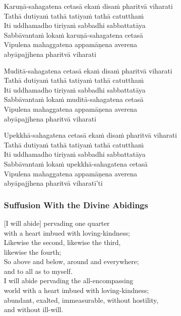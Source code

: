 Karuṇā-sahagatena cetasā ekaṁ disaṁ pharitvā viharati\\
Tathā dutiyaṁ tathā tatiyaṁ tathā catutthaṁ\\
Iti uddhamadho tiriyaṁ sabbadhi sabbattatāya\\
Sabbāvantaṁ lokaṁ karuṇā-sahagatena cetasā\\
Vipulena mahaggatena appamāṇena averena\\
abyāpajjhena pharitvā viharati

Muditā-sahagatena cetasā ekaṁ disaṁ pharitvā viharati\\
Tathā dutiyaṁ tathā tatiyaṁ tathā catutthaṁ\\
Iti uddhamadho tiriyaṁ sabbadhi sabbattatāya\\
Sabbāvantaṁ lokaṁ muditā-sahagatena cetasā\\
Vipulena mahaggatena appamāṇena averena\\
abyāpajjhena pharitvā viharati

\clearpage

Upekkhā-sahagatena cetasā ekaṁ disaṁ pharitvā viharati\\
Tathā dutiyaṁ tathā tatiyaṁ tathā catutthaṁ\\
Iti uddhamadho tiriyaṁ sabbadhi sabbattatāya\\
Sabbāvantaṁ lokaṁ upekkhā-sahagatena cetasā\\
Vipulena mahaggatena appamāṇena averena\\
abyāpajjhena pharitvā viharatī'ti 

\subsubsection{Suffusion With the Divine Abidings}


\smallskip

\begin{leader}
\end{leader}

[I will abide] pervading one quarter\\
with a heart imbued with loving-kindness;\\
Likewise the second, likewise the third,\\ likewise the fourth;\\
So above and below, around and everywhere;\\ and to all as to myself.\\
I will abide pervading the all-encompassing\\
world with a heart imbued with loving-kindness;\\
abundant, exalted, immeasurable, without hostility,\\
and without ill-will.

